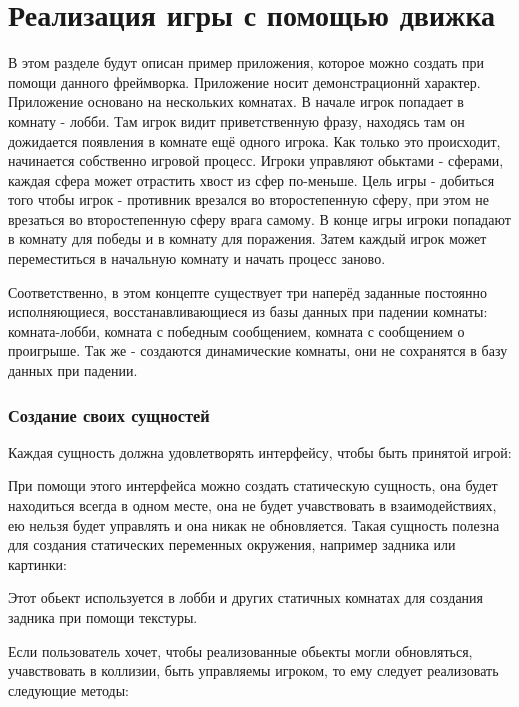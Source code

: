 \documentclass[a4paper,14pt, openany]{book}
\begin{document}
\chapter{Реализация игры с помощью движка}

В этом разделе будут описан пример приложения, которое можно создать при помощи данного фреймворка. Приложение носит демонстрационнй характер. Приложение основано на нескольких комнатах. В начале игрок попадает в комнату - лобби. Там игрок видит приветственную фразу, находясь там он дожидается появления в комнате ещё одного игрока. Как только это происходит, начинается собственно игровой процесс. Игроки управляют обьктами - сферами, каждая сфера может отрастить хвост из сфер по-меньше. Цель игры -  добиться того чтобы игрок - противник врезался во второстепенную сферу, при этом не врезаться во второстепенную сферу врага самому. В конце игры игроки попадают в комнату для победы и в комнату для поражения. Затем каждый игрок может переместиться в начальную комнату и начать процесс заново.

Соответственно, в этом концепте существует три наперёд заданные постоянно исполняющиеся, восстанавливающиеся из базы данных при падении комнаты: комната-лобби, комната с победным сообщением, комната с сообщением о проигрыше. Так же - создаются динамические комнаты, они не сохранятся в базу данных при падении.  

\subsection{Создание своих сущностей}

Каждая сущность должна удовлетворять интерфейсу, чтобы быть принятой игрой:


При помощи этого интерфейса можно создать статическую сущность, она будет находиться всегда в одном месте, она не будет учавствовать в взаимодействиях, ею нельзя будет управлять и она никак не обновляется. Такая сущность полезна для создания статических переменных окружения, например задника или картинки:


Этот обьект используется в лобби и других статичных комнатах для создания задника при помощи текстуры.

Если пользователь хочет, чтобы реализованные обьекты могли обновляться, учавствовать в коллизии, быть управляемы игроком, то ему следует реализовать следующие методы:

\end{document}
